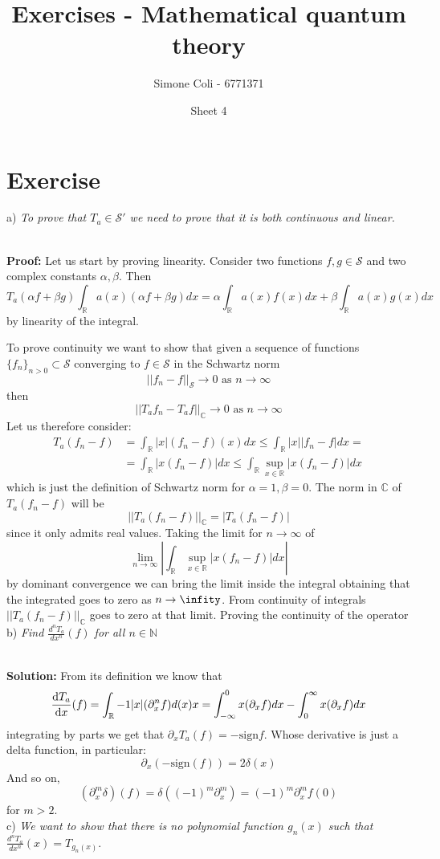 \documentclass{article}
\title{Exercises - Mathematical quantum theory}
\author{Simone Coli - 6771371}
\date{Sheet 4}
\newcommand{\R}{\mathbb{R}}
\newcommand{\C}{\mathbb{C}}
\newcommand{\ex}{\textit}
\newcommand{\sol}{\\ \textbf{Solution: }}
\newcommand{\proof}{\\ \textbf{Proof: }}
\newcommand{\ondv}[3]{\frac{d^{#1} #2}{d{#3}^{#1}}}
\begin{document}
\maketitle
\section{Exercise}
a) \ex{To prove that $T_a \in \mathcal{S'}$ we need to prove that it is both continuous and linear.}

\proof Let us start by proving linearity. Consider two functions $f, g \in \mathcal{S}$ and two complex constants $\alpha, \beta$. Then 
\[
    T_a (\alpha f + \beta g)\int_{\R} a(x) (\alpha f + \beta g) dx = \alpha \int_\R a(x) f(x) dx + \beta \int_\R a(x) g(x) dx
\]
by linearity of the integral.

To prove continuity we want to show that given a sequence of functions $\{ f_n \}_{n > 0} \subset \mathcal{S}$ converging to $f \in \mathcal{S}$ in the Schwartz norm
\[
    || f_n - f ||_\mathcal{S} \to 0 \text{ as } n \to \infty
\]
then
\[
    ||T_a f_n - T_a f ||_\C \to 0 \text{ as } n \to \infty
\]
Let us therefore consider:
\[
\begin{split}
     T_a(f_n -f ) &= \int_\R |x| (f_n -f)(x) dx \leq \int_\R |x||f_n -f| dx = \\
    &=  \int_\R |x(f_n -f)| dx \leq \int_\R \sup_{x \in \R}|x(f_n -f)| dx
\end{split}
\]
which is just the definition of Schwartz norm for $\alpha = 1, \beta = 0$. The norm in $\C$ of $T_a (f_n -f)$ will be 
\[
    ||T_a(f_n-f)||_\C = | T_a (f_n - f)|
\]
since it only admits real values. Taking the limit for $n \to \infty$ of 
\[
    \lim_{n \to \infty} \left|\int_\R \sup_{x \in \R}|x(f_n -f)| dx \right|
\]
by dominant convergence we can bring the limit inside the integral obtaining that the integrated goes to zero as $n \to \infity$. From continuity of integrals $||T_a(f_n-f)||_\C$ goes to zero at that limit. Proving the continuity of the operator
\\
b) \ex{Find $\ondv{n}{T_a}{x}(f)$ for all $n \in \mathbb N$}

\sol From its definition we know that
\[
    \odv{T_a}{x}(f) = \int_\R -1 |x| (\partial_x ^n f) d(x)x =  \int_{-\infty}^0 x (\partial_x f) dx - \int_0 ^\infty x (\partial_x f) dx
\]
integrating by parts we get that $ \partial_x T_a (f)= - \text{sign}{f}$. Whose derivative is just a delta function, in particular:
\[
    \partial_x (-\text{sign} (f)) = 2 \delta(x)
\]
And so on,
\[
    (\partial_x^m \delta) (f) = \delta ((-1)^m \partial_x^m) = (-1)^m \partial ^m_x f (0)
\]
for $m >2$.
\\
c) \ex{We want to show that there is no polynomial function $g_n(x)$ such that $\frac{d^n T_a}{dx^n} (x) = T_{g_n (x)}$}.
\end{document}

